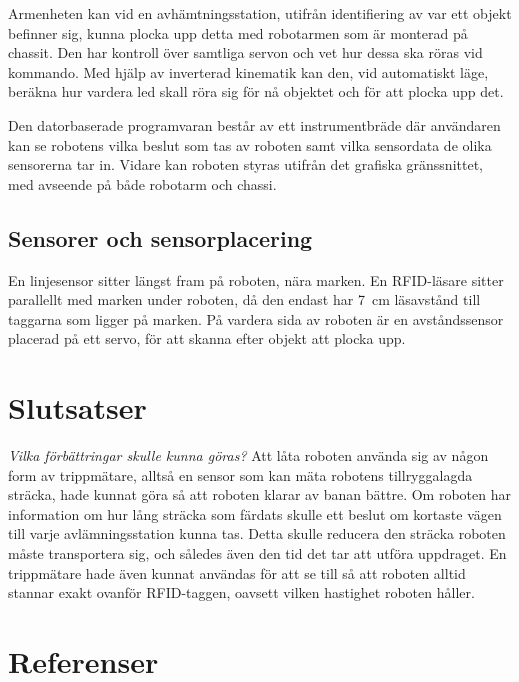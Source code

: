 \documentclass[a4paper,12pt]{article}
\begin{document}
Armenheten kan vid en avhämtningsstation, utifrån identifiering av var ett objekt befinner sig, kunna plocka upp detta med robotarmen som är monterad på chassit. Den har kontroll över samtliga servon och vet hur dessa ska röras vid kommando. Med hjälp av inverterad kinematik kan den, vid automatiskt läge, beräkna hur vardera led skall röra sig för nå objektet och för att plocka upp det.

Den datorbaserade programvaran består av ett instrumentbräde där användaren kan se robotens vilka beslut som tas av roboten samt vilka sensordata de olika sensorerna tar in. Vidare kan roboten styras utifrån det grafiska gränssnittet, med avseende på både robotarm och chassi.

\subsection{Sensorer och sensorplacering}

En linjesensor sitter längst fram på roboten, nära marken. En RFID-läsare sitter parallellt med marken under roboten, då den endast har 7~cm läsavstånd till taggarna som ligger på marken. På vardera sida av roboten är en avståndssensor placerad på ett servo, för att skanna efter objekt att plocka upp.









\section{Slutsatser}
\emph{Vilka förbättringar skulle kunna göras?}
Att låta roboten använda sig av någon form av trippmätare, alltså en sensor som kan mäta robotens tillryggalagda sträcka, hade kunnat göra så att roboten klarar av banan bättre. Om roboten har information om hur lång sträcka som färdats skulle ett beslut om kortaste vägen till varje avlämningsstation kunna tas. Detta skulle reducera den sträcka roboten måste transportera sig, och således även den tid det tar att utföra uppdraget.  En trippmätare hade även kunnat användas för att se till så att roboten alltid stannar exakt ovanför RFID-taggen, oavsett vilken hastighet roboten håller. 

\newpage
\section*{Referenser}


\newpage
\appendix

\end{document}
